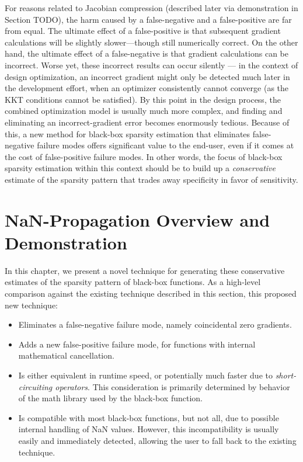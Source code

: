 For reasons related to Jacobian compression (described later via demonstration in Section TODO), the harm caused by a false-negative and a false-positive are far from equal. The ultimate effect of a false-positive is that subsequent gradient calculations will be slightly slower—though still numerically correct. On the other hand, the ultimate effect of a false-negative is that gradient calculations can be incorrect. Worse yet, these incorrect results can occur silently — in the context of design optimization, an incorrect gradient might only be detected much later in the development effort, when an optimizer consistently cannot converge (as the KKT conditions cannot be satisfied). By this point in the design process, the combined optimization model is usually much more complex, and finding and eliminating an incorrect-gradient error becomes enormously tedious. Because of this, a new method for black-box sparsity estimation that eliminates false-negative failure modes offers significant value to the end-user, even if it comes at the cost of false-positive failure modes. In other words, the focus of black-box sparsity estimation within this context should be to build up a \emph{conservative} estimate of the sparsity pattern that trades away specificity in favor of sensitivity.


\section{NaN-Propagation Overview and Demonstration}
\label{sec:nan-demo}

In this chapter, we present a novel technique for generating these conservative estimates of the sparsity pattern of black-box functions. As a high-level comparison against the existing technique described in this section, this proposed new technique:

\begin{itemize}[noitemsep]
    \item Eliminates a false-negative failure mode, namely coincidental zero gradients.
    \item Adds a new false-positive failure mode, for functions with internal mathematical cancellation.
    \item Is either equivalent in runtime speed, or potentially much faster due to \emph{short-circuiting operators}. This consideration is primarily determined by behavior of the math library used by the black-box function.
    \item Is compatible with most black-box functions, but not all, due to possible internal handling of NaN values. However, this incompatibility is usually easily and immediately detected, allowing the user to fall back to the existing technique.
\end{itemize}

